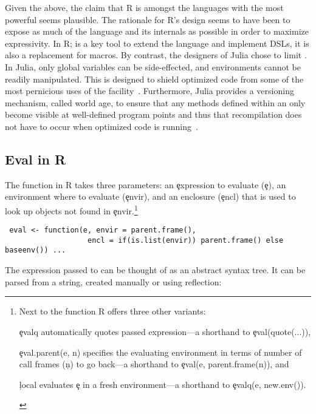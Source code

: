\documentclass[screen,acmsmall]{acmart}
\begin{document}
Given the above, the claim that R is amongst the languages with the most
powerful \eval seems plausible. The rationale for R's design seems to have been
to expose as much of the language and its internals as possible in order to
maximize expressivity. In R; \eval is a key tool to extend the language and
implement DSLs, it is also a replacement for macros. By contrast, the designers
of Julia chose to limit \eval. In Julia, only global variables can be
side-effected, and environments cannot be readily manipulated. This is designed
to shield optimized code from some of the most pernicious uses of the
facility~\cite{oopsla18a}. Furthermore, Julia provides a versioning
mechanism, called world age, to ensure that any methods defined within an \eval
only become visible at well-defined program points and thus that recompilation
does not have to occur when optimized code is running~\cite{oopsla20a}.

\subsection{Eval in R}\label{sec:eval-in-r}

The \eval function in R takes three parameters: an \c{expression} to evaluate
(\c{e}), an environment where to evaluate (\c{envir}), and an enclosure
(\c{encl}) that is used to look up objects not found in \c{envir}.\footnote{Next to the \eval function R
  offers three other variants:
  \begin{inparaenum}[1.]
    \item \c{evalq} automatically quotes passed expression---a shorthand to
      \c{eval(quote(...))},
    \item \c{eval.parent(e, n)} specifies the evaluating
      environment in terms of number of call frames (\c{n}) to go back---a shorthand
      to \c{eval(e, parent.frame(n))}, and
    \item \c{local} evaluates \c{e} in a fresh
      environment---a shorthand to \c{evalq(e, new.env())}.
  \end{inparaenum} }
%
\begin{lstlisting}
 eval <- function(e, envir = parent.frame(),
                   encl = if(is.list(envir)) parent.frame() else baseenv()) ...
\end{lstlisting}

\noindent The expression passed to \eval can be thought of as an abstract
syntax tree. It can be parsed from a string, created manually or using
reflection:
\end{document}
